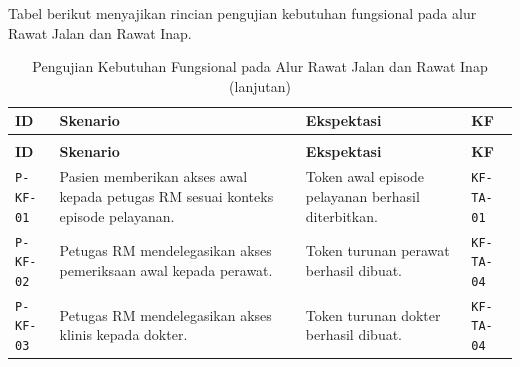 \documentclass[bahasa, 12pt, a4paper, onecolumn, oneside, final]{report}
\begin{document}
Tabel berikut menyajikan rincian pengujian kebutuhan fungsional pada alur Rawat Jalan dan Rawat Inap.

\begingroup
\small
\renewcommand{\arraystretch}{1.2}
\begin{longtable}{|p{}|p{}|p{}|p{}|}
	\caption{Pengujian Kebutuhan Fungsional pada Alur Rawat Jalan dan Rawat Inap}
	\label{tab:pengujian-kebutuhan-fungsional}                                                                                                 \\
	\hline
	\textbf{ID}                                                                        & \textbf{Skenario} & \textbf{Ekspektasi} & \textbf{KF} \\ \hline
	\endfirsthead

	\caption[]{Pengujian Kebutuhan Fungsional pada Alur Rawat Jalan dan Rawat Inap (lanjutan)}                                                 \\
	\hline
	\textbf{ID}                                                                        & \textbf{Skenario} & \textbf{Ekspektasi} & \textbf{KF} \\ \hline
	\endhead

	\texttt{P-KF-01}                                                                   &
	Pasien memberikan akses awal kepada petugas RM sesuai konteks episode pelayanan.   &
	Token awal episode pelayanan berhasil diterbitkan.                                 &
	\texttt{KF-TA-01}                                                                                                                          \\ \hline
	\texttt{P-KF-02}                                                                   &
	Petugas RM mendelegasikan akses pemeriksaan awal kepada perawat.                   &
	Token turunan perawat berhasil dibuat.                                             &
	\texttt{KF-TA-04}                                                                                                                          \\ \hline

	\texttt{P-KF-03}                                                                   &
	Petugas RM mendelegasikan akses klinis kepada dokter.                              &
	Token turunan dokter berhasil dibuat.                                              &
	\texttt{KF-TA-04}                                                                                                                          \\ \hline


\end{longtable}
\end{document}
